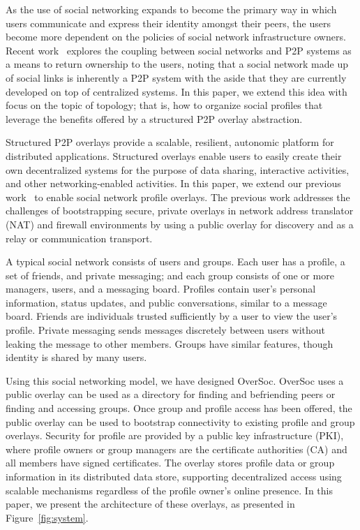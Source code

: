 \documentclass{IEEEtran}
\begin{document}
As the use of social networking expands to become the primary way in which
users communicate and express their identity amongst their peers, the users
become more dependent on the policies of social network infrastructure owners.
Recent work~\cite{p2p_socialnetwork} explores the coupling between social
networks and P2P systems as a means to return ownership to the users, noting
that a social network made up of social links is inherently a P2P system with
the aside that they are currently developed on top of centralized systems.  In
this paper, we extend this idea with focus on the topic of topology; that is,
how to organize social profiles that leverage the benefits offered by a
structured P2P overlay abstraction.

Structured P2P overlays provide a scalable, resilient, autonomic platform for
distributed applications.  Structured overlays enable users to easily create
their own decentralized systems for the purpose of data sharing, interactive
activities, and other networking-enabled activities.  In this paper, we extend
our previous work~\cite{vpo} to enable social network profile overlays.  The
previous work addresses the challenges of bootstrapping secure, private
overlays in network address translator (NAT) and firewall environments by using
a public overlay for discovery and as a relay or communication transport.  

A typical social network consists of users and groups.  Each user has a
profile, a set of friends, and private messaging; and each group consists of
one or more managers, users, and a messaging board.  Profiles contain user's
personal information, status updates, and public conversations, similar to a
message board.  Friends are individuals trusted sufficiently by a user to view
the user's profile.  Private messaging sends messages discretely between users
without leaking the message to other members.  Groups have similar features,
though identity is shared by many users.

Using this social networking model, we have designed OverSoc.  OverSoc uses a
public overlay can be used as a directory for finding and befriending peers or
finding and accessing groups.  Once group and profile access has been offered,
the public overlay can be used to bootstrap connectivity to existing profile
and group overlays.  Security for profile are provided by a public key
infrastructure (PKI), where profile owners or group managers are the
certificate authorities (CA) and all members have signed certificates.  The
overlay stores profile data or group information in its distributed data store,
supporting decentralized access using scalable mechanisms regardless of the
profile owner's online presence.  In this paper, we present the architecture of
these overlays, as presented in Figure~\ref{fig:system}.
\end{document}
